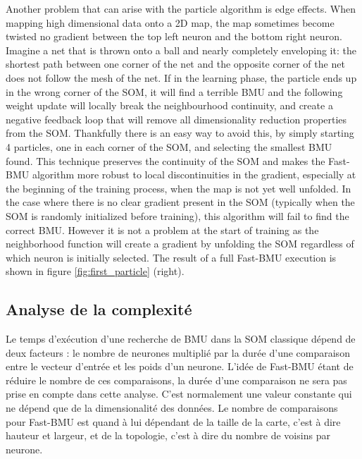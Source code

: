 	Another problem that can arise with the particle algorithm is edge effects. When mapping high dimensional data onto a 2D map, the map sometimes become twisted  no gradient between the top left neuron and the bottom right neuron. Imagine a net that is thrown onto a ball and nearly completely enveloping it: the shortest path between one corner of the net and the opposite corner of the net does not follow the mesh of the net. If in the learning phase, the particle ends up in the wrong corner of the SOM, it will find a terrible BMU and the following weight update will locally break the neighbourhood continuity, and create a negative feedback loop that will remove all dimensionality reduction properties from the SOM. Thankfully there is an easy way to avoid this, by simply starting 4 particles, one in each corner of the SOM, and selecting the smallest BMU found. This technique preserves the continuity of the SOM and makes the Fast-BMU algorithm more robust to local discontinuities in the gradient, especially at the beginning of the training process, when the map is not yet well unfolded. In the case where there is no clear gradient present in the SOM (typically when the SOM is randomly initialized before training), this algorithm will fail to find the correct BMU. However it is not a problem at the start of training as the neighborhood function will create a gradient by unfolding the SOM regardless of which neuron is initially selected. The result of a full Fast-BMU execution is shown in figure \ref{fig:first_particle} (right).

	\subsection{Analyse de la complexité}\label{seq:complex_analysis}

	Le temps d'exécution d'une recherche de BMU dans la SOM classique dépend de deux facteurs : le nombre de neurones multiplié par la durée d'une comparaison entre le vecteur d'entrée et les poids d'un neurone. L'idée de Fast-BMU étant de réduire le nombre de ces comparaisons, la durée d'une comparaison ne sera pas prise en compte dans cette analyse. C'est normalement une valeur constante qui ne dépend que de la dimensionalité des données. Le nombre de comparaisons pour Fast-BMU est quand à lui dépendant de la taille de la carte, c'est à dire hauteur et largeur, et de la topologie, c'est à dire du nombre de voisins par neurone. 

